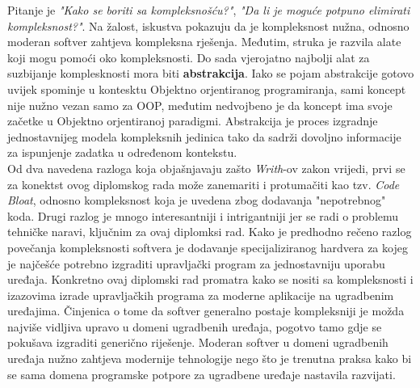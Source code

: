 Pitanje je \textit{"Kako se boriti sa kompleksnošću?"}, \textit{"Da li je moguće potpuno elimirati kompleksnost?"}. Na žalost, iskustva pokazuju da je kompleksnost nužna, odnosno moderan softver zahtjeva kompleksna rješenja. Međutim, struka je razvila alate koji mogu pomoći oko kompleksnosti. Do sada vjerojatno najbolji alat za suzbijanje komplesknosti mora biti \textbf{abstrakcija}. Iako se pojam abstrakcije gotovo uvijek spominje u kontesktu Objektno orjentiranog programiranja, sami koncept nije nužno vezan samo za OOP, međutim nedvojbeno je da koncept ima svoje začetke u Objektno orjentiranoj paradigmi. Abstrakcija je proces izgradnje jednostavnijeg modela kompleksnih jedinica tako da sadrži dovoljno informacije za ispunjenje zadatka u određenom kontekstu. \\   

Od dva navedena razloga koja objašnjavaju zašto \textit{Writh}-ov zakon vrijedi, prvi se za konektst ovog diplomskog rada može zanemariti i protumačiti kao tzv. \textit{Code Bloat}, odnosno kompleksnost koja je uvedena zbog dodavanja "nepotrebnog" koda. Drugi razlog je mnogo interesantniji i intrigantniji jer se radi o problemu tehničke naravi, ključnim za ovaj diplomksi rad. Kako je predhodno rečeno razlog povečanja kompleksnosti softvera je dodavanje specijaliziranog hardvera za kojeg je najčešće potrebno izgraditi upravljački program za jednostavniju uporabu uređaja. Konkretno ovaj diplomski rad promatra kako se nositi sa kompleksnosti i izazovima izrade upravljačkih programa za moderne aplikacije na ugradbenim uređajima. Činjenica o tome da softver generalno postaje kompleksniji je možda najviše vidljiva upravo u domeni ugradbenih uređaja, pogotvo tamo gdje se pokušava izgraditi generično riješenje. Moderan softver u domeni ugradbenih uređaja nužno zahtjeva modernije tehnologije nego što je trenutna praksa kako bi se sama domena programske potpore za ugradbene uređaje nastavila razvijati.
\pagebreak

